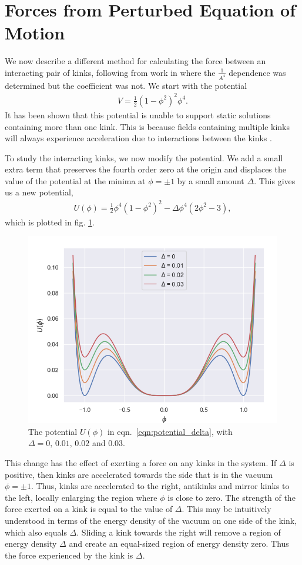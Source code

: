 \documentclass[11pt, oneside]{article}  	%
\numberwithin{equation}{section}
\begin{document}
\section{Forces from Perturbed Equation of Motion}\label{sec:gonzales}
We now describe a different method for calculating the force between an interacting pair of kinks, following from work in \cite{gonzalez_solitary_1987,gonzalez_kinks_1989} where the $\frac{1}{A^4}$ dependence was determined but the coefficient was not. We start with the potential
\begin{align}
    V = \frac{1}{2} \left ( 1 - \phi^2\right)^2 \phi^4.
\end{align}
It has been shown that this potential is unable to support static solutions containing more than one kink. This is because fields containing multiple kinks will always experience acceleration due to interactions between the kinks \cite{manton_forces_2019}.\par
To study the interacting kinks, we now modify the potential. We add a small extra term that preserves the fourth order zero at the origin and displaces the value of the potential at the minima at $\phi = \pm 1$ by a small amount $\Delta$. This gives us a new potential,
\begin{align}\label{eqn:potential_delta}
    U(\phi) = \frac{1}{2}\phi^4 \left (1-\phi^2\right )^2 - \Delta\phi^4 \left (  2 \phi^2 - 3 \right),
\end{align} 
which is plotted in fig. \ref{potential_delta}.\par
\begin{figure}[t]
    \vspace{-10pt}
    \centering
    \includegraphics[width=0.42 \columnwidth]{potential_delta}
    \caption{The potential $U(\phi)$ in eqn.~\ref{eqn:potential_delta}, with $\Delta = 0,\, 0.01,\,0.02$ and $0.03$.} 
    \label{potential_delta}
    \vspace{+10pt}
\end{figure}
This change has the effect of exerting a force on any kinks in the system. If $\Delta$ is positive, then kinks are accelerated towards the side that is in the vacuum $\phi = \pm1$. Thus, kinks are accelerated to the right, antikinks and mirror kinks to the left, locally enlarging the region where $\phi$ is close to zero. The strength of the force exerted on a kink is equal to the value of $\Delta$. This may be intuitively understood in terms of the energy density of the vacuum on one side of the kink, which also equals $\Delta$. Sliding a kink towards the right will remove a region of energy density $\Delta$ and create an equal-sized region of energy density zero. Thus the force experienced by the kink is $\Delta$. \par
\end{document}
